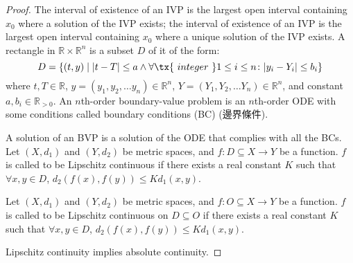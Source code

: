 \documentclass[a4paper,12pt]{report}
\begin{document}
\begin{itemize}
\begin{itemize}
\begin{proof}
The interval of existence of an IVP is the largest open interval containing $x_0$ where a solution of the IVP exists; the interval of existence of an IVP is the largest open interval containing $x_0$ where a unique solution of the IVP exists.
A rectangle in $\mathbb{R}\times\mathbb{R}^n$ is a subset $D$ of it of the form:
\[D=\{(t,y)\mid|t-T|\leq a\land\forall\tx{\ integer\ }1\leq i\leq n\colon |y_i-Y_i|\leq b_i\}\]
where $t,T\in\mathbb{R}$, $y=(y_1, y_2,\dots  y_n)\in\mathbb{R}^n$, $Y=(Y_1, Y_2,\dots  Y_n)\in\mathbb{R}^n$, and constant $a,b_i\in\mathbb{R}_{>0}$.
An $n$th-order boundary-value problem is an $n$th-order ODE with some conditions called boundary conditions (BC) (邊界條件).

A solution of an BVP is a solution of the ODE that complies with all the BCs.
Let $(X,d_1)$ and $(Y,d_2)$ be metric spaces, and $f\colon D\subseteq X\to Y$ be a function. $f$ is called to be Lipschitz continuous if there exists a real constant $K$ such that $\forall x,y\in D$, $d_{2}(f(x),f(y))\leq Kd_{1}(x,y)$.

Let $(X,d_1)$ and $(Y,d_2)$ be metric spaces, and $f\colon O\subseteq X\to Y$ be a function. $f$ is called to be Lipschitz continuous on $D\subseteq O$ if there exists a real constant $K$ such that $\forall x,y\in D$, $d_{2}(f(x),f(y))\leq Kd_{1}(x,y)$.

Lipschitz continuity implies absolute continuity.


\end{proof}
\end{itemize}
\end{itemize}
\end{document}
